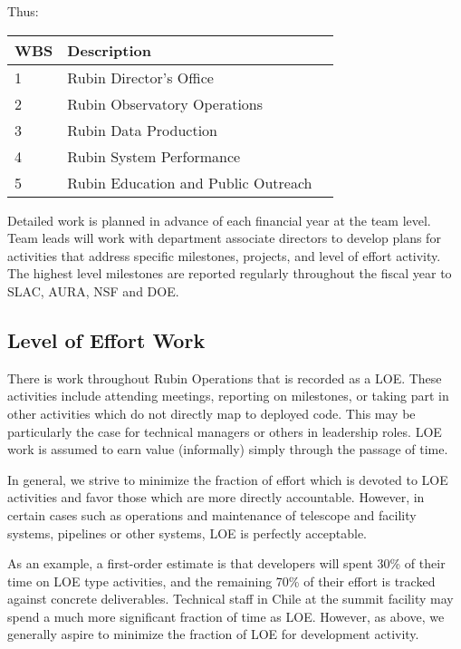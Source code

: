 Thus:

\begin{longtable}[]{@{}lll@{}}
\hline
\gls{WBS} & Description \tabularnewline
\hline
\endhead

1 & Rubin Director's Office  \tabularnewline
2 & Rubin Observatory Operations  \tabularnewline
3 & Rubin Data Production \tabularnewline
4 & Rubin System Performance  \tabularnewline
5 & Rubin Education and Public Outreach \tabularnewline

\hline
\end{longtable}


Detailed work is planned in advance of each financial year at the team level.
Team leads will work with department associate directors to develop plans for activities that address specific milestones, projects, and level of effort activity.
The highest level milestones are reported regularly throughout the fiscal year to SLAC, AURA, NSF and DOE.


\subsection{Level of Effort Work}
\label{sec:loe}

There is work throughout Rubin Operations that is recorded as a \gls{LOE}.
These activities include attending meetings, reporting on milestones, or taking part in other activities which do not directly map to deployed code.
This may be particularly the case for technical managers or others in leadership roles.
\gls{LOE} work is assumed to earn value (informally) simply through the passage of time.

In general, we strive to minimize the fraction of effort which is devoted to \gls{LOE} activities and favor those which are more directly accountable.
However, in certain cases such as operations and maintenance of telescope and facility systems, pipelines or other systems, \gls{LOE} is perfectly acceptable.

As an example, a first-order estimate is that developers will spent 30\% of their time on \gls{LOE} type activities, and the remaining 70\% of their effort is tracked against concrete deliverables.
Technical staff in Chile at the summit facility may spend a much more significant fraction of time as  \gls{LOE}.
However, as above, we generally aspire to minimize the fraction of \gls{LOE} for development activity.


